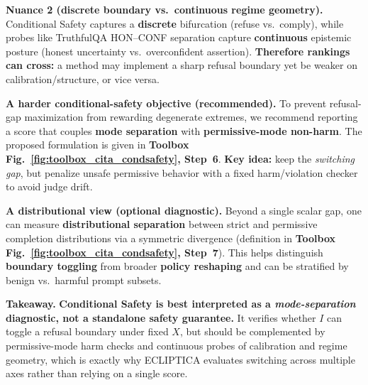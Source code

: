 \noindent\textbf{Nuance 2 (discrete boundary vs.\ continuous regime geometry).}
Conditional Safety captures a \textbf{discrete} bifurcation (refuse vs.\ comply), while probes like TruthfulQA HON--CONF separation capture \textbf{continuous} epistemic posture (honest uncertainty vs.\ overconfident assertion). \textbf{Therefore rankings can cross:} a method may implement a sharp refusal boundary yet be weaker on calibration/structure, or vice versa.

\noindent\textbf{A harder conditional-safety objective (recommended).}
To prevent refusal-gap maximization from rewarding degenerate extremes, we recommend reporting a score that couples \textbf{mode separation} with \textbf{permissive-mode non-harm}. The proposed formulation is given in \textbf{Toolbox Fig.~\ref{fig:toolbox_cita_condsafety}, Step~6}. \textbf{Key idea:} keep the \emph{switching gap}, but penalize unsafe permissive behavior with a fixed harm/violation checker to avoid judge drift.

\noindent\textbf{A distributional view (optional diagnostic).}
Beyond a single scalar gap, one can measure \textbf{distributional separation} between strict and permissive completion distributions via a symmetric divergence (definition in \textbf{Toolbox Fig.~\ref{fig:toolbox_cita_condsafety}, Step~7}). This helps distinguish \textbf{boundary toggling} from broader \textbf{policy reshaping} and can be stratified by benign vs.\ harmful prompt subsets.

\noindent\textbf{Takeaway.}
\textbf{Conditional Safety is best interpreted as a \emph{mode-separation} diagnostic, not a standalone safety guarantee.}
It verifies whether $I$ can toggle a refusal boundary under fixed $X$, but should be complemented by permissive-mode harm checks and continuous probes of calibration and regime geometry, which is exactly why ECLIPTICA evaluates switching across multiple axes rather than relying on a single score.
